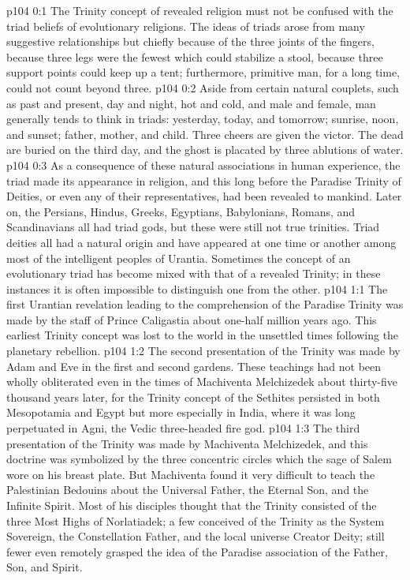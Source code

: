 \author{Melchizedek}
\vs p104 0:1 The Trinity concept of revealed religion must not be confused with the triad beliefs of evolutionary religions. The ideas of triads arose from many suggestive relationships but chiefly because of the three joints of the fingers, because three legs were the fewest which could stabilize a stool, because three support points could keep up a tent; furthermore, primitive man, for a long time, could not count beyond three.
\vs p104 0:2 Aside from certain natural couplets, such as past and present, day and night, hot and cold, and male and female, man generally tends to think in triads: yesterday, today, and tomorrow; sunrise, noon, and sunset; father, mother, and child. Three cheers are given the victor. The dead are buried on the third day, and the ghost is placated by three ablutions of water.
\vs p104 0:3 As a consequence of these natural associations in human experience, the triad made its appearance in religion, and this long before the Paradise Trinity of Deities, or even any of their representatives, had been revealed to mankind. Later on, the Persians, Hindus, Greeks, Egyptians, Babylonians, Romans, and Scandinavians all had triad gods, but these were still not true trinities. Triad deities all had a natural origin and have appeared at one time or another among most of the intelligent peoples of Urantia. Sometimes the concept of an evolutionary triad has become mixed with that of a revealed Trinity; in these instances it is often impossible to distinguish one from the other.\plusone
{}%
\vs p104 1:1 The first Urantian revelation leading to the comprehension of the Paradise Trinity was made by the staff of Prince Caligastia about one\hyp{}half million years ago. This earliest Trinity concept was lost to the world in the unsettled times following the planetary rebellion.
\vs p104 1:2 The second presentation of the Trinity was made by Adam and Eve in the first and second gardens. These teachings had not been wholly obliterated even in the times of Machiventa Melchizedek about thirty\hyp{}five thousand years later, for the Trinity concept of the Sethites persisted in both Mesopotamia and Egypt but more especially in India, where it was long perpetuated in Agni, the Vedic three\hyp{}headed fire god.
\vs p104 1:3 The third presentation of the Trinity was made by Machiventa Melchizedek, and this doctrine was symbolized by the three concentric circles which the sage of Salem wore on his breast plate. But Machiventa found it very difficult to teach the Palestinian Bedouins about the Universal Father, the Eternal Son, and the Infinite Spirit. Most of his disciples thought that the Trinity consisted of the three Most Highs of Norlatiadek; a few conceived of the Trinity as the System Sovereign, the Constellation Father, and the local universe Creator Deity; still fewer even remotely grasped the idea of the Paradise association of the Father, Son, and Spirit.
